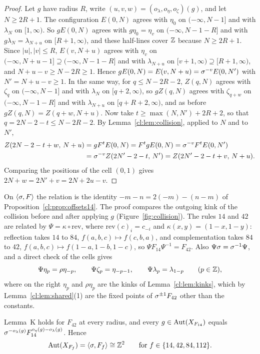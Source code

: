 \begin{proof}
Let $g$ have radius $R$, write $(u,v,w)=(o_\lambda,o_\eta,o_\zeta)(g)$, and let $N\ge2R+1$. The configuration $E(0,N)$ agrees with $\eta_0$ on $(-\infty,N-1]$ and with $\lambda_N$ on $[1,\infty)$. So $gE(0,N)$ agrees with $g\eta_0=\eta_v$ on $(-\infty,N-1-R]$ and with $g\lambda_N=\lambda_{N+u}$ on $[R+1,\infty)$, and these half-lines cover $\mathbb{Z}$ because $N\ge2R+1$. Since $|u|,|v|\le R$, $E(v,N+u)$ agrees with $\eta_v$ on $(-\infty,N+u-1]\supseteq(-\infty,N-1-R]$ and with $\lambda_{N+u}$ on $[v+1,\infty)\supseteq[R+1,\infty)$, and $N+u-v\ge N-2R\ge1$. Hence $gE(0,N)=E(v,N+u)=\sigma^{-v}E(0,N')$ with $N'=N+u-v\ge1$. In the same way, for $q\le N-2R-2$, $Z(q,N)$ agrees with $\zeta_q$ on $(-\infty,N-1]$ and with $\lambda_N$ on $[q+2,\infty)$, so $gZ(q,N)$ agrees with $\zeta_{q+w}$ on $(-\infty,N-1-R]$ and with $\lambda_{N+u}$ on $[q+R+2,\infty)$, and as before $gZ(q,N)=Z(q+w,N+u)$. Now take $t\ge\max(N,N')+2R+2$, so that $q=2N-2-t\le N-2R-2$. By Lemma~\ref{cl:lem:collision}, applied to $N$ and to $N'$,
\begin{align*}
Z(2N-2-t+w,\,N+u)&=gF^tE(0,N)=F^tgE(0,N)=\sigma^{-v}F^tE(0,N')\\
&=\sigma^{-v}Z(2N'-2-t,\,N')=Z(2N'-2-t+v,\,N+u).
\end{align*}
Comparing the positions of the cell $(0,1)$ gives $2N+w=2N'+v=2N+2u-v$.
\end{proof}


On $\langle\sigma,F\rangle$ the relation is the identity $-m-n=2(-m)-(n-m)$ of Proposition~\ref{cl:prop:offsets14}. The proof compares the outgoing kink of the collision before and after applying $g$ (Figure~\ref{fig:collision}). The rules $14$ and $42$ are related by $\Psi=\kappa\circ\mathrm{rev}$, where $\mathrm{rev}(c)_i=c_{-i}$ and $\kappa(x,y)=(1-x,1-y)$: reflection takes $14$ to $84$, $f(a,b,c)\mapsto f(c,b,a)$, and complementation takes $84$ to $42$, $f(a,b,c)\mapsto f(1-a,1-b,1-c)$, so $\Psi F_{14}\Psi^{-1}=F_{42}$. Also $\Psi\sigma=\sigma^{-1}\Psi$, and a direct check of the cells gives
\begin{equation}\label{cl:eq:Psi}
\Psi\eta_p=\rho\eta_{-p},\qquad\Psi\zeta_p=\eta_{-p-1},\qquad\Psi\lambda_p=\lambda_{1-p}\qquad(p\in\mathbb{Z}),
\end{equation}
where on the right $\eta_p$ and $\rho\eta_p$ are the kinks of Lemma~\ref{cl:lem:kinks}, which by Lemma~\ref{cl:lem:shared}(1) are the fixed points of $\sigma^{\pm1}F_{42}$ other than the constants.

\begin{theorem}\label{cl:thm:14rigid}
Lemma~K holds for $F_{42}$ at every radius, and every $g\in\operatorname{Aut}(X_{F_{14}})$ equals $\sigma^{-o_\lambda(g)}F_{14}^{o_\eta(g)-o_\lambda(g)}$. Hence
\[
\operatorname{Aut}(X_{F_f})=\langle\sigma,F_f\rangle\cong\mathbb{Z}^2\qquad\text{for }f\in\{14,42,84,112\}.
\]
\end{theorem}

